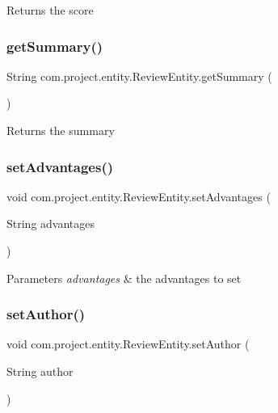 \begin{DoxyReturn}{Returns}
the score 
\end{DoxyReturn}
\mbox{\label{classcom_1_1project_1_1entity_1_1_review_entity_a5a9fd2b78dcbd2f34e2d73effebbf45d}} 
\subsubsection{get\+Summary()}
{\footnotesize\ttfamily String com.\+project.\+entity.\+Review\+Entity.\+get\+Summary (\begin{DoxyParamCaption}{ }\end{DoxyParamCaption})}

\begin{DoxyReturn}{Returns}
the summary 
\end{DoxyReturn}
\mbox{\label{classcom_1_1project_1_1entity_1_1_review_entity_a96442854e8c7a0bc020f6abe29d9a2d6}} 
\subsubsection{set\+Advantages()}
{\footnotesize\ttfamily void com.\+project.\+entity.\+Review\+Entity.\+set\+Advantages (\begin{DoxyParamCaption}\item[{String}]{advantages }\end{DoxyParamCaption})}


\begin{DoxyParams}{Parameters}
{\em advantages} & the advantages to set \\
\hline
\end{DoxyParams}
\mbox{\label{classcom_1_1project_1_1entity_1_1_review_entity_acd3b24891ec352f74a30acb7ad0a0d00}} 
\subsubsection{set\+Author()}
{\footnotesize\ttfamily void com.\+project.\+entity.\+Review\+Entity.\+set\+Author (\begin{DoxyParamCaption}\item[{String}]{author }\end{DoxyParamCaption})}



